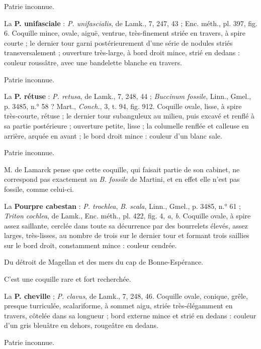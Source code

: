 \documentclass[a4paper, 11pt, oneside, polutonikogreek, french]{article}
\begin{document}
Patrie inconnue.

\bigskip

La \textbf{P. unifasciale} : \emph{P. unifascialis}, de Lamk., 7, 247, 43 ; Enc. méth., pl. 397, fig. 6. Coquille mince, ovale, aiguë, ventrue, très-finement striée en travers, à spire courte ; le dernier tour garni postérieurement d'une série de nodules striés transversalement ; ouverture très-large, à bord droit mince, strié en dedans : couleur roussâtre, avec une bandelette blanche en travers.

Patrie inconnue.

\bigskip

La \textbf{P. rétuse} : \emph{P. retusa}, de Lamk., 7, 248, 44 ; \emph{Buccinum fossile}, Linn., Gmel., p. 3485, n.° 58 ? Mart., \emph{Conch.}, 3, t. 94, fig. 912. Coquille ovale, lisse, à spire très-courte, rétuse ; le dernier tour subanguleux au milieu, puis excavé et renflé à sa partie postérieure ; ouverture petite, lisse ; la columelle renflée et calleuse en arrière, arquée en avant ; le bord droit mince : couleur d'un blanc sale.

Patrie inconnue.

M. de Lamarck pense que cette coquille, qui faisait partie de son cabinet, ne correspond pas exactement au \emph{B. fossile} de Martini, et en effet elle n'est pas fossile, comme celui-ci.

\bigskip

La \textbf{Pourpre cabestan} : \emph{P. trochlea}, \emph{B. scala}, Linn., Gmel., p. 3485, n.° 61 ; \emph{Triton cochlea}, de Lamk., Enc. méth., pl. 422, fig. 4, \emph{a}, \emph{b}. Coquille ovale, à spire assez saillante, cerclée dans toute sa décurrence par des bourrelets élevés, assez larges, très-lisses, au nombre de trois sur le dernier tour et formant trois saillies sur le bord droit, constamment mince : couleur cendrée.

Du détroit de Magellan et des mers du cap de Bonne-Espérance.

C'est une coquille rare et fort recherchée.

\bigskip

La \textbf{P. cheville} ; \emph{P. clavus}, de Lamk., 7, 248, 46. Coquille ovale, conique, grêle, presque turriculée, scalariforme, à sommet aigu, striée très-élégamment en travers, côtelée dans sa longueur ; bord externe mince et strié en dedans : couleur d'un gris bleuâtre en dehors, rougeâtre en dedans.

Patrie inconnue.

\bigskip
\end{document}
